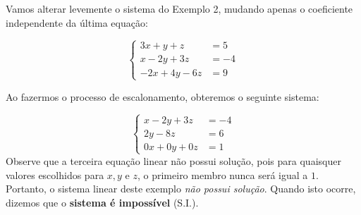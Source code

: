 \begin{example}{}
Vamos alterar levemente o sistema do Exemplo 2, mudando apenas o coeficiente independente da última equação:


\begin{equation*}
\left \{
\begin{aligned}
3x+y+z&=5\\
x-2y+3z&=-4\\
-2x+4y-6z&=9
\end{aligned}
\right.
\end{equation*}

Ao fazermos o processo de escalonamento, obteremos o seguinte sistema:

\begin{equation*}
\left \{
\begin{aligned}
x-2y+3z&=-4\\
2y-8z&=6\\
0x+0y+0z&=1
\end{aligned}
\right.
\end{equation*}
Observe que a terceira equação linear não possui solução, pois para quaisquer valores escolhidos para $x, y$ e $z$, o primeiro membro nunca será igual a $1$. Portanto, o sistema linear deste exemplo \emph{não possui solução}. Quando isto ocorre, dizemos que o \textbf{sistema é impossível} (S.I.).
\end{example}



\label{\detokenize{AF107-5:praticando-sistemas-lineares}}\label{\detokenize{AF107-5::doc}}

